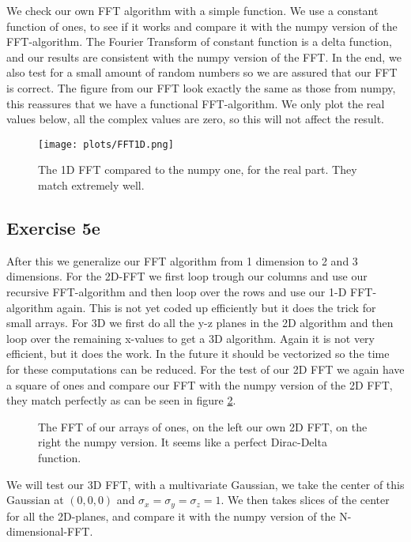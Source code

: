 We check our own FFT algorithm with a simple function. We use a constant function of ones, to see if it works and compare it with the numpy version of the FFT-algorithm. The Fourier Transform of  constant function is a delta function, and our results are consistent with the numpy version of the FFT. In the end, we also test for a small amount of random numbers so we are assured that our FFT is correct. The figure  from our FFT look exactly the same as those from numpy, this reassures that we have a functional FFT-algorithm. We only plot the real values below, all the complex values are zero, so this will not affect the result.

\begin{figure}
    \centering
    \texttt{[image: plots/FFT1D.png]}
    \caption{The 1D FFT compared to the numpy one, for the real part. They match extremely well.}
    \label{fig:my_label}
\end{figure}


\subsection{Exercise 5e}
After this we generalize our FFT algorithm from 1 dimension to 2 and 3 dimensions. For the 2D-FFT we first loop trough our columns and use our recursive FFT-algorithm and then loop over the rows and use our 1-D FFT-algorithm again. This is not yet coded up efficiently but it does the trick for small arrays. For 3D we first do all the y-z planes in the 2D algorithm and then loop over the remaining x-values to get a 3D algorithm. Again it is not very efficient, but it does the work. In the future it should be vectorized so the time for these computations can be reduced. For the test of our 2D FFT we again have a square of ones and compare our FFT with the numpy version of the 2D FFT, they match perfectly as can be seen in figure \ref{2dfft}.

 \begin{figure}
    \centering
    \qquad
    \caption{The FFT of our arrays of ones, on the left our own 2D FFT, on the right the numpy version. It seems like a perfect Dirac-Delta function.}
    \label{2dfft}
  \end{figure}

We will test our 3D FFT, with a multivariate Gaussian, we take the center of this Gaussian at $(0,0,0)$ and $\sigma_x=\sigma_y=\sigma_z=1$. We then takes slices of the center for all the 2D-planes, and compare it with the numpy version of the N-dimensional-FFT.



